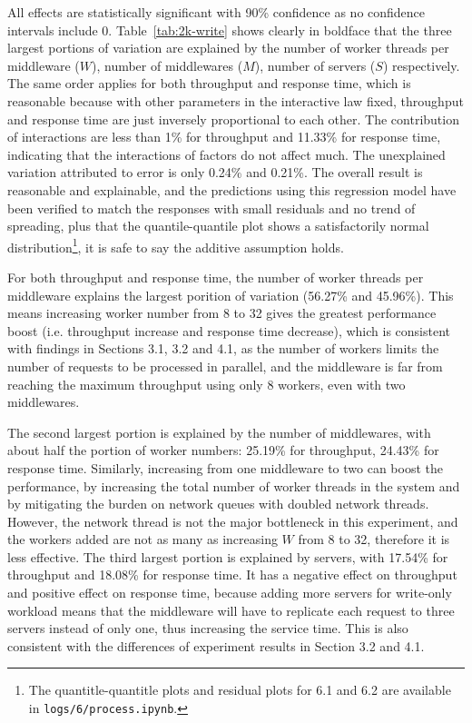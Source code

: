 All effects are statistically significant with 90\% confidence as no confidence intervals include 0. Table~\ref{tab:2k-write} shows clearly in boldface that the three largest portions of variation are explained by the number of worker threads per middleware ($W$), number of middlewares ($M$), number of servers ($S$) respectively. The same order applies for both throughput and response time, which is reasonable because with other parameters in the interactive law fixed, throughput and response time are just inversely proportional to each other. The contribution of interactions are less than 1\% for throughput and 11.33\% for response time, indicating that the interactions of factors do not affect much. The unexplained variation attributed to error is only 0.24\% and 0.21\%. The overall result is reasonable and explainable, and the predictions using this regression model have been verified to match the responses with small residuals and no trend of spreading, plus that the quantile-quantile plot shows a satisfactorily normal distribution\footnote{The quantitle-quantitle plots and residual plots for 6.1 and 6.2 are available in \texttt{logs/6/process.ipynb}.}, it is safe to say the additive assumption holds.

For both throughput and response time, the number of worker threads per middleware explains the largest porition of variation (56.27\% and 45.96\%). This means increasing worker number from 8 to 32 gives the greatest performance boost (i.e. throughput increase and response time decrease), which is consistent with findings in Sections 3.1, 3.2 and 4.1, as the number of workers limits the number of requests to be processed in parallel, and the middleware is far from reaching the maximum throughput using only 8 workers, even with two middlewares. 

The second largest portion is explained by the number of middlewares, with about half the portion of worker numbers: 25.19\% for throughput, 24.43\% for response time. Similarly, increasing from one middleware to two can boost the performance, by increasing the total number of worker threads in the system and by mitigating the burden on network queues with doubled network threads. However, the network thread is not the major bottleneck in this experiment, and the workers added are not as many as increasing $W$ from 8 to 32, therefore it is less effective. The third largest portion is explained by servers, with 17.54\% for throughput and 18.08\% for response time. It has a negative effect on throughput and positive effect on response time, because adding more servers for write-only workload means that the middleware will have to replicate each request to three servers instead of only one, thus increasing the service time. This is also consistent with the differences of experiment results in Section 3.2 and 4.1.

